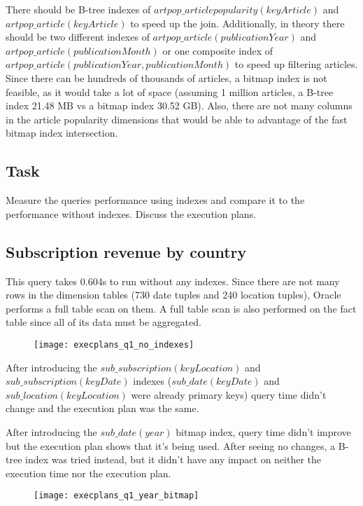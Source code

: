 There should be B-tree indexes of $artpop\_articlepopularity(keyArticle)$ and $artpop\_article(keyArticle)$ to speed up the join. Additionally, in theory there should be two different indexes of $artpop\_article(publicationYear)$ and $artpop\_article(publicationMonth)$ or one composite index of $artpop\_article(publicationYear, publicationMonth)$ to speed up filtering articles. Since there can be hundreds of thousands of articles, a bitmap index is not feasible, as it would take a lot of space (assuming 1 million articles, a B-tree index 21.48 MB vs a bitmap index 30.52 GB). Also, there are not many columns in the article popularity dimensions that would be able to advantage of the fast bitmap index intersection.

\subsection*{Task} 
Measure the queries performance using indexes and compare it to the
performance without indexes. Discuss the execution plans.

\subsection*{Subscription revenue by country} 
This query takes 0.604s to run without any indexes. Since there are not many rows in the dimension tables (730 date tuples and 240 location tuples), Oracle performs a full table scan on them. A full table scan is also performed on the fact table since all of its data must be aggregated.

\begin{figure}[!htp]
\begin{center}
  \texttt{[image: execplans\_q1\_no\_indexes]}
\end{center}
\end{figure}

After introducing the $sub\_subscription(keyLocation)$ and $sub\_subscription(keyDate)$ indexes ($sub\_date(keyDate)$ and $sub\_location(keyLocation)$ were already primary keys) query time didn't change and the execution plan was the same.

After introducing the $sub\_date(year)$ bitmap index, query time didn't improve but the execution plan shows that it's being used. After seeing no changes, a B-tree index was tried instead, but it didn't have any impact on neither the execution time nor the execution plan.

\begin{figure}[!htp]
\begin{center}
  \texttt{[image: execplans\_q1\_year\_bitmap]}
\end{center}
\end{figure}

